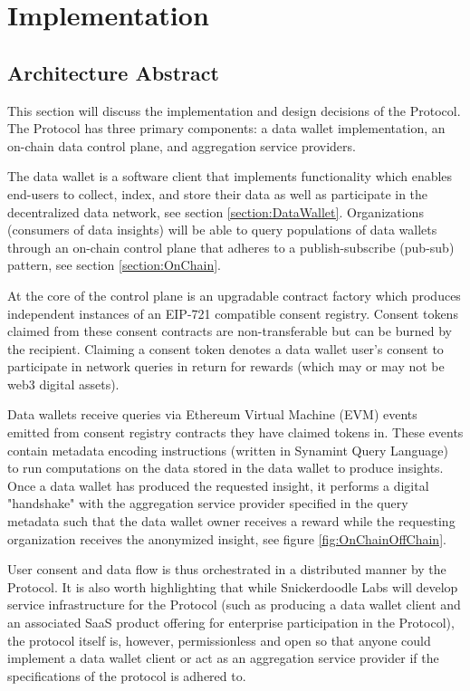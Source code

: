\section{Implementation}
\label{section:Implementation}
\subsection{Architecture Abstract}
\label{section:Architecture}

This section will discuss the implementation and design decisions of the Protocol. The Protocol has three primary 
components: a data wallet implementation, an on-chain data control plane, and aggregation service providers.

The data wallet is a software client that implements functionality which enables end-users to collect, index, and store their data as well as participate 
in the decentralized data network, see section \ref{section:DataWallet}. Organizations (consumers of data insights) will be able 
to query populations of data wallets through an on-chain control plane that adheres to a publish-subscribe (pub-sub) pattern, see section \ref{section:OnChain}. 

At the core of the control plane is an upgradable contract factory which produces independent instances of an EIP-721 compatible consent registry. 
Consent tokens claimed from these consent contracts are non-transferable but can be burned by the recipient. Claiming a consent token denotes a data 
wallet user's consent to participate in network queries in return for rewards (which may or may not be web3 digital assets). 

Data wallets receive queries via Ethereum Virtual Machine (EVM) events emitted from consent registry contracts they have claimed tokens in. These events contain metadata encoding
instructions (written in Synamint Query Language) to run computations on the data stored in the data wallet to produce insights. Once a data wallet has produced
the requested insight, it performs a digital "handshake" with the aggregation service provider specified in the query metadata such that the 
data wallet owner receives a reward while the requesting organization receives the anonymized insight, see figure \ref{fig:OnChainOffChain}. 

User consent and data flow is thus orchestrated in a distributed manner by the Protocol. It is also worth highlighting that while 
Snickerdoodle Labs will develop service infrastructure for the Protocol (such as producing a data wallet client and an associated SaaS product offering 
for enterprise participation in the Protocol), the protocol itself is, however, permissionless and open so that anyone could implement a 
data wallet client or act as an aggregation service provider if the specifications of the protocol is adhered to. 
